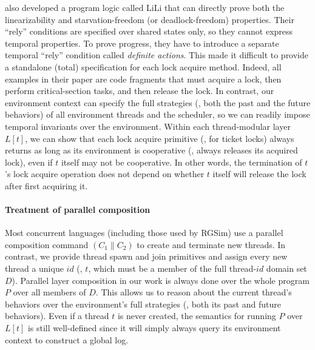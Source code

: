 \citet{lili16} also developed a program logic called LiLi that can
directly prove both the linearizability and starvation-freedom (or
deadlock-freedom) properties. Their ``rely'' conditions are specified
over shared states only, so they cannot express temporal properties. To
prove progress, they have to introduce a separate temporal ``rely''
condition called {\em definite actions}.  This made it difficult to
provide a standalone (total) specification for each lock acquire
method.  Indeed, all examples in their paper are code fragments that
must acquire a lock, then perform critical-section tasks, and then release the
lock. In contrast, our environment context can specify the full
strategies (\ie, both the past and the future behaviors) of all
environment threads and the scheduler, so we can readily impose
temporal invariants over the environment. Within each thread-modular
layer $L[t]$, we can show that each lock acquire primitive (\eg, for
ticket locks) always returns as long as its environment is cooperative
(\eg, always releases its acquired lock), even if $t$ itself may not
be cooperative.
In other words, the termination of $t$'s lock acquire
operation does not depend on whether $t$ itself will release the lock
after first acquiring it.


\paragraph{Treatment of parallel composition}
Most concurrent languages (including those used by RGSim) use a
parallel composition command $(C_1 \| C_2)$ to create and terminate
new threads.  In contrast, we provide thread spawn and join
primitives and assign every new thread a unique $id$ (\eg, $t$, which
must be a member of the full thread-$id$  domain set $D$). Parallel layer
composition in our work is always done over the whole program $P$ over
all members of $D$. This allows us to reason about the current
thread's behaviors over the environment's full strategies (\ie, both
its past and future behaviors). Even if a thread $t$ is never
created, the semantics for running $P$ over $L[t]$ is still well-defined since it will simply always query its environment context to
construct a global log.

